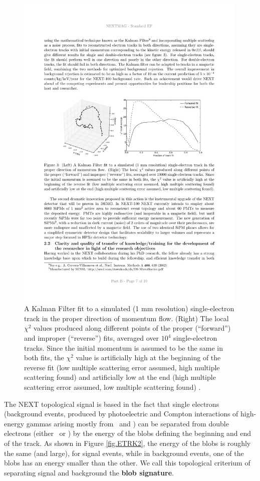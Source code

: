 \begin{figure}
\centering
\includegraphics[width=0.99\textwidth]{img/KALMAN.pdf}
\caption{\small A Kalman Filter fit to a simulated (1 mm resolution) single-electron track in the proper direction of momentum flow. (Right) The local $\chi^2$ values produced along different points of the proper (``forward'') and improper (``reverse'') fits, averaged over $10^4$ single-electron tracks. Since the initial momentum is assumed to be the same in both fits, the $\chi^2$ value is artificially high at the beginning of the reverse fit (low multiple scattering error assumed, high multiple scattering found) and artificially low at the end (high multiple scattering error assumed, low multiple scattering found) .} \label{fig.KF}
\end{figure}

The NEXT topological signal is based in the fact that single electrons (background events, produced by photoelectric and Compton interactions of high-energy gammas arising mostly from \BI\ and \TL) can be separated from double electrons (either \bbonu\ or \bbtnu) by the energy of the blobs defining the beginning and end of the track. As shown in Figure \ref{fig.ETRK2}, the energy of the blobs is roughly the same (and large), for signal events, while in background events, one of the blobs has an energy smaller than the other. We call this topological criterium of separating signal and background the {\bf blob signature}.

